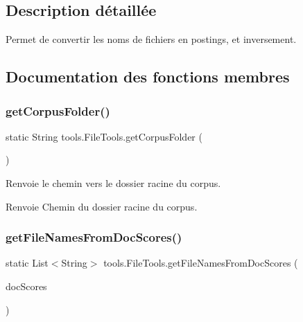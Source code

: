 \subsection{Description détaillée}
Permet de convertir les noms de fichiers en postings, et inversement. 

\subsection{Documentation des fonctions membres}
\mbox{\label{classtools_1_1FileTools_a7858c30aa9831f703fe073b1f0ec2a4d}} 
\subsubsection{\texorpdfstring{get\+Corpus\+Folder()}{getCorpusFolder()}}
{\footnotesize\ttfamily static String tools.\+File\+Tools.\+get\+Corpus\+Folder (\begin{DoxyParamCaption}{ }\end{DoxyParamCaption})\hspace{0.3cm}{\ttfamily [static]}}

Renvoie le chemin vers le dossier racine du corpus.

\begin{DoxyReturn}{Renvoie}
Chemin du dossier racine du corpus. 
\end{DoxyReturn}
\mbox{\label{classtools_1_1FileTools_ad9fd6276d74325a0f76909a7e8e98c08}} 
\subsubsection{\texorpdfstring{get\+File\+Names\+From\+Doc\+Scores()}{getFileNamesFromDocScores()}}
{\footnotesize\ttfamily static List$<$String$>$ tools.\+File\+Tools.\+get\+File\+Names\+From\+Doc\+Scores (\begin{DoxyParamCaption}\item[{List$<$ \hyperlink{classquery_1_1DocScore}{Doc\+Score} $>$}]{doc\+Scores }\end{DoxyParamCaption})\hspace{0.3cm}{\ttfamily [static]}}


